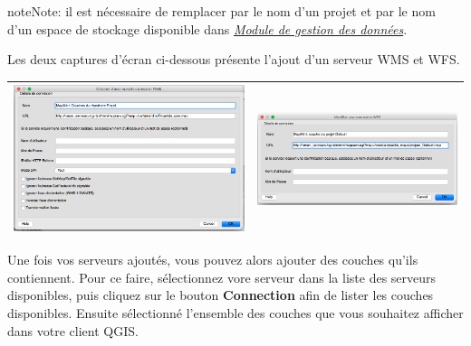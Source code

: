 \documentclass[letterpaper,10pt,french]{sphinxmanual}
\begin{document}
\begin{notice}{note}{Note:}
il est nécessaire de remplacer  par le nom d'un projet
et  par le nom d'un espace de stockage
disponible dans {\hyperref[data/index:data]{\emph{Module de gestion des données}}}.
\end{notice}

Les deux captures d'écran ci-dessous présente l'ajout d'un serveur WMS
et WFS.

\begin{tabulary}{\linewidth}{|L|L|}
\hline

\includegraphics{qgis-wms.png}
 & 
\includegraphics{qgis-wfs.png}
\\
\hline\end{tabulary}


Une fois vos serveurs ajoutés, vous pouvez alors ajouter des couches
qu'ils contiennent. Pour ce faire, sélectionnez vore serveur dans la
liste des serveurs disponibles, puis cliquez sur le bouton
\textbf{Connection} afin de lister les couches disponibles. Ensuite
sélectionné l'ensemble des couches que vous souhaitez afficher dans
votre client QGIS.
\end{document}
